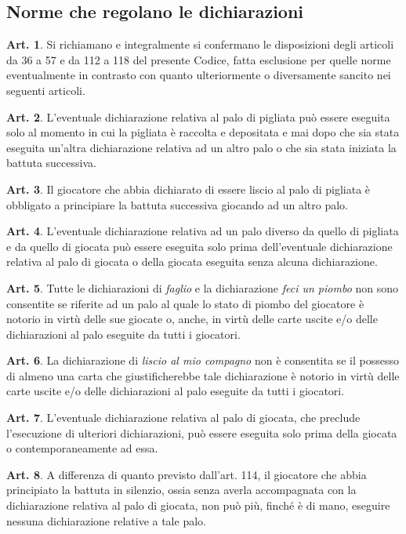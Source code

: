 \documentclass[italian,a4paper]{article}
\theoremstyle{definition}
\newtheorem{art}{Art.}
\begin{document}
\subsection{Norme che regolano le dichiarazioni}
\begin{art}
Si richiamano e integralmente si confermano le disposizioni degli articoli da 36 a 57 e da 112 a 118 del presente Codice, fatta esclusione per quelle norme eventualmente in contrasto con quanto ulteriormente o diversamente sancito nei seguenti articoli.
\end{art}
\begin{art}
L'eventuale dichiarazione relativa al palo di pigliata può essere eseguita solo al momento in cui la pigliata è raccolta e depositata e mai dopo che sia stata eseguita un'altra dichiarazione relativa ad un altro palo o che sia stata iniziata la battuta successiva.
\end{art}
\begin{art}
Il giocatore che abbia dichiarato di essere liscio al palo di pigliata è obbligato a principiare la battuta successiva giocando ad un altro palo.
\end{art}
\begin{art}
L'eventuale dichiarazione relativa ad un palo diverso da quello di pigliata e da quello di giocata può essere eseguita solo prima dell'eventuale dichiarazione relativa al palo di giocata o della giocata eseguita senza alcuna dichiarazione.
\end{art}
\begin{art}
Tutte le dichiarazioni di \emph{faglio} e la dichiarazione \emph{feci un piombo} non sono consentite se riferite ad un palo al quale lo stato di piombo del giocatore è notorio in virtù delle sue giocate o, anche, in virtù delle carte uscite e/o delle dichiarazioni al palo eseguite da tutti i giocatori.
\end{art}
\begin{art}
La dichiarazione di \emph{liscio al mio compagno} non è consentita se il possesso di almeno una carta che giustificherebbe tale dichiarazione è notorio in virtù delle carte uscite e/o delle dichiarazioni al palo eseguite da tutti i giocatori.
\end{art}
\begin{art}
L'eventuale dichiarazione relativa al palo di giocata, che preclude l'esecuzione di ulteriori dichiarazioni, può essere eseguita solo prima della giocata o contemporaneamente ad essa.
\end{art}
\begin{art}
A differenza di quanto previsto dall'art. 114, il giocatore che abbia principiato la battuta in silenzio, ossia senza averla accompagnata con la dichiarazione relativa al palo di giocata, non può più, finché è di mano, eseguire nessuna dichiarazione relative a tale palo.
\end{art}
\end{document}
